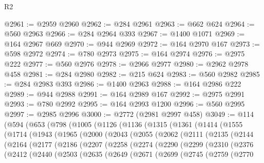 \begin{lexlean}{R2}
\begin{coremodule}
@2961 := @2959 @2960
@2962 := @284 @2961
@2963 := @662 @624
@2964 := @560 @2963
@2966 := @284 @2964 @393
@2967 := @1400 @1071
@2969 := @164 @2967 @669
@2970 := @944 @2969
@2972 := @164 @2970 @167
@2973 := @598 @2972
@2974 := @780 @2973
@2975 := @164 @2974
@2976 := @2975 @222
@2977 := @560 @2976
@2978 := @2966 @2977
@2980 := @2962 @2978 @458
@2981 := @284 @2980
@2982 := @215 @624
@2983 := @560 @2982
@2985 := @284 @2983 @393
@2986 := @1400 @2963
@2988 := @164 @2986 @222
@2989 := @944 @2988
@2991 := @164 @2989 @167
@2992 := @2975 @2991
@2993 := @780 @2992
@2995 := @164 @2993 @1200
@2996 := @560 @2995
@2997 := @2985 @2996
@3000 := @2772 (@2981 @2997 @458)
@3049 := @114
    (@594
      (@653
        (@798
          (@1005
            (@1126
              (@1136
                (@1315
                  (@1361
                    (@1414
                      (@1555
                        (@1714
                          (@1943
                            (@1965
                              (@2000
                                (@2043
                                  (@2055
                                    (@2062
                                      (@2111
                                        (@2135
                                          (@2144
                                            (@2164
                                              (@2177
                                                (@2186
                                                  (@2207
                                                    (@2258
                                                      (@2274
                                                        (@2290
                                                          (@2299
                                                            (@2310
                                                              (@2376
                                                                (@2412
                                                                  (@2440
                                                                    (@2503
                                                                      (@2635
                                                                        (@2649
                                                                          (@2671
                                                                            (@2699
                                                                              (@2745
                                                                                (@2759
                                                                                  (@2770

\end{coremodule}
\end{lexlean}
